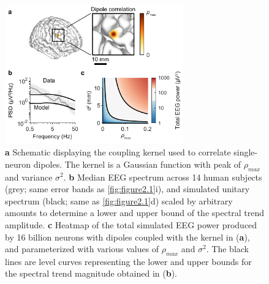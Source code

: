 \begin{figure}
\vspace{-12pt}
\includegraphics[width=77mm]{Figures/chapter2/figure2.pdf}
\vspace{-10pt}
    \caption{ 
	\textbf{a} Schematic displaying the coupling kernel used to correlate single-neuron dipoles. The kernel is a Gaussian function with peak of $\rho_{max}$ and variance $\sigma^2$.
	\textbf{b} Median EEG spectrum across 14 human subjects (grey; same error bands as \autoref{fig:figure2.1}i), and simulated unitary spectrum (black; same as \autoref{fig:figure2.1}d) scaled by arbitrary amounts to determine a lower and upper bound of the spectral trend amplitude. 
	\textbf{c} Heatmap of the total simulated EEG power produced by 16 billion neurons with dipoles coupled with the kernel in (\textbf{a}), and parameterized with various values of $\rho_{max}$ and $\sigma^2$. The black lines are level curves representing the lower and upper bounds for the spectral trend magnitude obtained in (\textbf{b}).
    } \label{fig:figure2.2}
\end{figure}


